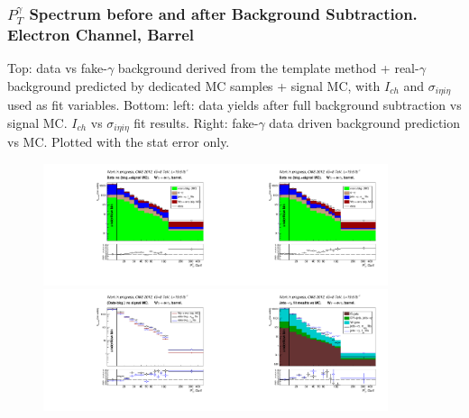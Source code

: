 \begin{frame}\frametitle{\footnotesize{$P_T^{\gamma}$ Spectrum before and after Background Subtraction. Electron Channel, Barrel}}
  \tiny{Top: data vs fake-$\gamma$ background derived from the template method + real-$\gamma$ background predicted by dedicated MC samples + signal MC, with $I_{ch}$ and $\sigma_{i\eta{i}\eta}$ used as fit variables. Bottom: left: data yields after full background subtraction vs signal MC. $I_{ch}$ vs $\sigma_{i\eta{i}\eta}$ fit results. Right: fake-$\gamma$ data driven background prediction vs MC. Plotted with the stat error only.}
  \begin{figure}[htb]
    \begin{center}
       \includegraphics[width=0.45\textwidth]{../figs/figs_v11/ELECTRON_WGamma/PrepareYields/c_DATAvsBkgPlusSigMCc_ELECTRON_WGamma_TEMPL_CHISO_UNblind__Barrel__phoEt.pdf}\includegraphics[width=0.45\textwidth]{../figs/figs_v11/ELECTRON_WGamma/PrepareYields/c_DATAvsBkgPlusSigMCc_ELECTRON_WGamma_TEMPL_SIHIH_UNblind__Barrel__phoEt.pdf}\\
       \includegraphics[width=0.45\textwidth]{../figs/figs_v11/ELECTRON_WGamma/PrepareYields/c_BkgSubtrDATAvsSIGMC_c_ELECTRON_WGamma__UNblind__Barrel__phoEt.pdf}\includegraphics[width=0.45\textwidth]{../figs/figs_v11/ELECTRON_WGamma/PrepareYields/c_FakeDDvsMC_c_ELECTRON_WGamma__UNblind__Barrel__phoEt.pdf}\\

\end{center}
\end{figure}
\end{frame}
